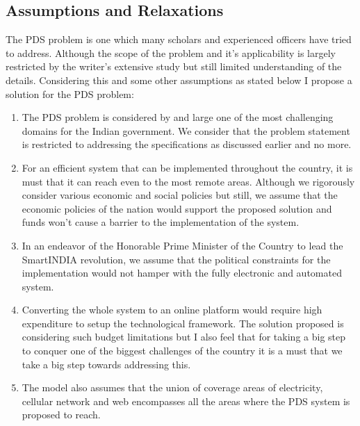 \documentclass{article}
\begin{document}
\subsection{Assumptions and Relaxations}

The PDS problem is one which many scholars and experienced officers have tried to address. Although the scope of the problem and it's applicability is largely restricted by the writer's extensive study but still limited understanding of the details. Considering this and some other assumptions as stated below I propose a solution for the PDS problem:

\begin{enumerate}
\item The PDS problem is considered by and large one of the most challenging domains for the Indian government. We consider that the problem statement is restricted to addressing the specifications as discussed earlier and no more. 
\item For an efficient system that can be implemented throughout the country, it is must that it can reach even to the most remote areas. Although we rigorously consider various economic and social policies but still, we assume that the economic policies of the nation would support the proposed solution and funds won't cause a barrier to the implementation of the system.
\item In an endeavor of the Honorable Prime Minister of the Country to lead the SmartINDIA revolution, we assume that the political constraints for the implementation would not hamper with the fully electronic and automated system.
\item Converting the whole system to an online platform would require high expenditure to setup the technological framework. The solution proposed is considering such budget limitations but I also feel that for taking a big step to conquer one of the biggest challenges of the country it is a must that we take a big step towards addressing this.
\item The model also assumes that the union of coverage areas of electricity, cellular network and web encompasses all the areas where the PDS system is proposed to reach. 
\end{enumerate}
\end{document}
